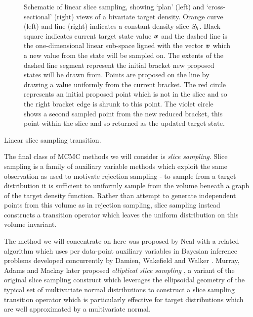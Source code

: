 \begin{figure}[t]
\centering
\begin{subfigure}[b]{.46\linewidth}
\centering
{}
\vspace{3mm}
\end{subfigure}
\begin{subfigure}[b]{.46\linewidth}
\centering
{}
\end{subfigure}
\caption[Schematic of linear slice sampling.]{Schematic of linear slice sampling, showing `plan' (left) and `cross-sectional' (right) views of a bivariate target density. Orange curve (left) and line (right) indicates a constant density slice $\mathit{S}_h$. Black square indicates current target state value $\boldsymbol{x}$ and the dashed line is the one-dimensional linear sub-space ligned with the vector $\boldsymbol{v}$ which a new value from the state will be sampled on. The extents of the dashed line segment represent the initial bracket new proposed states will be drawn from. Points are proposed on the line by drawing a value uniformly from the current bracket. The red circle represents an initial proposed point which is not in the slice and so the right bracket edge is shrunk to this point. The violet circle shows a second sampled point from the new reduced bracket, this point within the slice and so returned as the updated target state.}
\label{fig:slice-sampling}
\end{figure}


\begin{algorithm}[!t]
\caption{Linear slice sampling transition.}
\label{alg:linear-slice-sampling}

\end{algorithm}

The final class of \ac{MCMC} methods we will consider is \emph{slice sampling}. Slice sampling is a family of auxiliary variable methods which exploit the same observation as used to motivate rejection sampling - to sample from a target distribution it is sufficient to uniformly sample from the volume beneath a graph of the target density function. Rather than attempt to generate independent points from this volume as in rejection sampling, slice sampling instead constructs a transition operator which leaves the uniform distribution on this volume invariant.

The method we will concentrate on here was proposed by Neal \citep{neal1997markov,neal2003slice} with a related algorithm which uses per data-point auxiliary variables in Bayesian inference problems developed concurrently by Damien, Wakefield and Walker \citep{damien1999gibbs}. Murray, Adams and Mackay later proposed \emph{elliptical slice sampling} \citep{murray2010elliptical}, a variant of the original slice sampling construct which leverages the ellipsoidal geometry of the typical set of multivariate normal distributions to construct a slice sampling transition operator which is particularly effective for target distributions which are well approximated by a multivariate normal.

